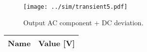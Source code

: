 \begin{figure}[H] \centering
\texttt{[image: ../sim/transient5.pdf]}
\caption{Output AC component + DC deviation.}
\label{fig:transient5}
\end{figure}

\begin{table}[H]
  \centering
  \begin{tabular}{|l|r|}
    \hline    
    {\bf Name} & {\bf Value [V]} \\ \hline
    
  \end{tabular}
  \label{tab:meanv012}
\end{table}




